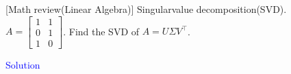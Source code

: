 \item {} [Math review(Linear Algebra)] Singularvalue decomposition(SVD). \\
$A=\left[\begin{array}{ll}1 & 1 \\ 0 & 1 \\ 1 & 0\end{array}\right]$. Find the SVD of $A=U \Sigma V^{\top}$.

\textcolor{blue}{Solution}




\newpage